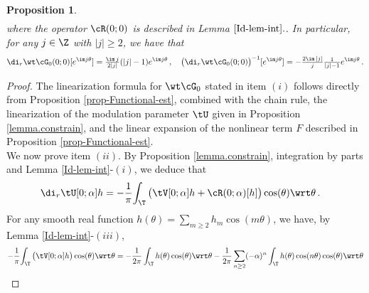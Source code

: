 \documentclass[a4paper,reqno,10pt]{article}
\newtheorem{pro}{Proposition}[section]
\begin{document}
\begin{pro}
\begin{align}
	\end{align}  
    where the operator $\cR(0;0)$ is described in Lemma $\ref{Id-lem-int}.$.  In particular, for any $j\in\Z$ with $|j|\geq 2$, we have that
   {
	\begin{equation}\label{dir.wtcG0}
		\di_{r} \wt\cG_{0}(0;0) [e^{\im j\theta}] =  \tfrac{\im\, j}{2|j|} (|j|-1) e^{\im j\theta} \,, \quad \big( \di_{r} \wt\cG_{0}(0;0) \big)^{-1} [e^{\im j \theta}] = - \tfrac{2 \im\, |j|}{j} \tfrac{1}{|j|-1} e^{\im j\theta}\,.
	\end{equation}}
\end{pro}
\begin{proof}
The linearization formula for $\wt\cG_{0}$ stated in item $(i)$ follows directly from Proposition \ref{prop-Functional-est}, combined with the chain rule, the linearization of the modulation parameter $\tU$ given in Proposition \ref{lemma.constrain}, and the linear expansion of the nonlinear term $F$ described in Proposition \ref{prop-Functional-est}.
\\
We now prove item $(ii)$.
    By Proposition \ref{lemma.constrain}, integration by parts and Lemma \ref{Id-lem-int}-$(i)$, we deduce that
    \begin{align}\label{alme1}
		\di_{r} \tU[0;\alpha] h
        & = - \frac{1}{\pi}{\int_{\T}\big( \tV[0;\alpha]h + \cR(0;\alpha)[h] \big) \cos(\theta) \wrt \theta} \,.
	\end{align}
For any smooth  real function 
        $\displaystyle{h(\theta)=\sum_{m\geqslant2}h_m \cos(m\theta)}$, we have, by Lemma \ref{Id-lem-int}-$(iii)$,
    \begin{align*}
 - \frac{1}{\pi}{\int_{\T}\big( \tV[0;\alpha]h \big) \cos(\theta) \wrt \theta}&=- \frac{1}{2\pi} \int_{\T}h(\theta)\cos(\theta)\wrt\theta -\frac{1}{2\pi}\sum_{n\geq 2} (-\alpha)^{n}  \int_{\T}h(\theta)\cos(n \theta)\cos(\theta)\wrt \theta \\

\end{align*}
\end{proof}
\end{document}
